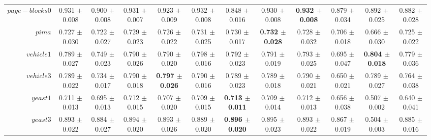 \begin{table}[!ht]
{\begin{tabular}{r c c c c c c c c c c c}
$page-blocks0$ & 0.931 $\pm$ 0.008 & 0.900 $\pm$ 0.008 & 0.931 $\pm$ 0.007 & 0.923 $\pm$ 0.009 & 0.932 $\pm$ 0.008 & 0.848 $\pm$ 0.016 & 0.930 $\pm$ 0.008 & \textbf{0.932 $\pm$ 0.008} & 0.879 $\pm$ 0.034 & 0.892 $\pm$ 0.025 & 0.882 $\pm$ 0.028 \\
$pima$ & 0.727 $\pm$ 0.030 & 0.722 $\pm$ 0.027 & 0.729 $\pm$ 0.023 & 0.726 $\pm$ 0.022 & 0.731 $\pm$ 0.025 & 0.730 $\pm$ 0.017 & \textbf{0.732 $\pm$ 0.028} & 0.728 $\pm$ 0.032 & 0.706 $\pm$ 0.018 & 0.666 $\pm$ 0.030 & 0.725 $\pm$ 0.022 \\
$vehicle1$ & 0.789 $\pm$ 0.027 & 0.749 $\pm$ 0.023 & 0.790 $\pm$ 0.026 & 0.790 $\pm$ 0.020 & 0.798 $\pm$ 0.016 & 0.792 $\pm$ 0.023 & 0.791 $\pm$ 0.019 & 0.793 $\pm$ 0.025 & 0.695 $\pm$ 0.047 & \textbf{0.804 $\pm$ 0.018} & 0.779 $\pm$ 0.036 \\
$vehicle3$ & 0.789 $\pm$ 0.022 & 0.734 $\pm$ 0.017 & 0.790 $\pm$ 0.018 & \textbf{0.797 $\pm$ 0.026} & 0.790 $\pm$ 0.016 & 0.789 $\pm$ 0.023 & 0.789 $\pm$ 0.018 & 0.790 $\pm$ 0.021 & 0.650 $\pm$ 0.021 & 0.789 $\pm$ 0.027 & 0.764 $\pm$ 0.038 \\
$yeast1$ & 0.711 $\pm$ 0.013 & 0.695 $\pm$ 0.013 & 0.712 $\pm$ 0.015 & 0.707 $\pm$ 0.020 & 0.709 $\pm$ 0.015 & \textbf{0.713 $\pm$ 0.011} & 0.709 $\pm$ 0.014 & 0.712 $\pm$ 0.013 & 0.656 $\pm$ 0.038 & 0.507 $\pm$ 0.002 & 0.640 $\pm$ 0.041 \\
$yeast3$ & 0.893 $\pm$ 0.022 & 0.884 $\pm$ 0.027 & 0.894 $\pm$ 0.020 & 0.893 $\pm$ 0.026 & 0.889 $\pm$ 0.020 & \textbf{0.896 $\pm$ 0.020} & 0.895 $\pm$ 0.023 & 0.893 $\pm$ 0.022 & 0.867 $\pm$ 0.019 & 0.504 $\pm$ 0.003 & 0.885 $\pm$ 0.016 \\
\end{tabular}}
\end{table}
